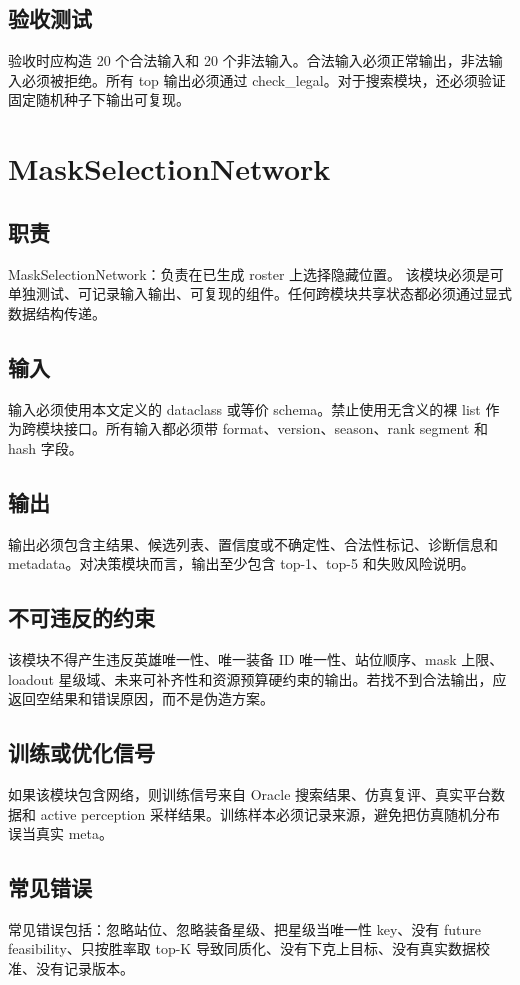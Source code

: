 \documentclass[UTF8,12pt,openany]{ctexbook}
\begin{document}
\subsection{验收测试}
验收时应构造 20 个合法输入和 20 个非法输入。合法输入必须正常输出，非法输入必须被拒绝。所有 top 输出必须通过 check\_legal。对于搜索模块，还必须验证固定随机种子下输出可复现。

\section{MaskSelectionNetwork}
\subsection{职责}
MaskSelectionNetwork：负责在已生成 roster 上选择隐藏位置。 该模块必须是可单独测试、可记录输入输出、可复现的组件。任何跨模块共享状态都必须通过显式数据结构传递。

\subsection{输入}
输入必须使用本文定义的 dataclass 或等价 schema。禁止使用无含义的裸 list 作为跨模块接口。所有输入都必须带 format、version、season、rank segment 和 hash 字段。

\subsection{输出}
输出必须包含主结果、候选列表、置信度或不确定性、合法性标记、诊断信息和 metadata。对决策模块而言，输出至少包含 top-1、top-5 和失败风险说明。

\subsection{不可违反的约束}
该模块不得产生违反英雄唯一性、唯一装备 ID 唯一性、站位顺序、mask 上限、loadout 星级域、未来可补齐性和资源预算硬约束的输出。若找不到合法输出，应返回空结果和错误原因，而不是伪造方案。

\subsection{训练或优化信号}
如果该模块包含网络，则训练信号来自 Oracle 搜索结果、仿真复评、真实平台数据和 active perception 采样结果。训练样本必须记录来源，避免把仿真随机分布误当真实 meta。

\subsection{常见错误}
常见错误包括：忽略站位、忽略装备星级、把星级当唯一性 key、没有 future feasibility、只按胜率取 top-K 导致同质化、没有下克上目标、没有真实数据校准、没有记录版本。
\end{document}
